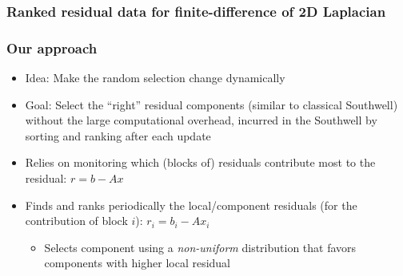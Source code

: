 \documentclass{beamer}
\begin{document}
\begin{frame}
	\frametitle{Ranked residual data for finite-difference of 2D Laplacian}
	\begin{figure}[H]
		\centering
	\end{figure}
\end{frame}


\begin{frame}
	\frametitle{Our approach}
	\begin{itemize}
		\item Idea: Make the random selection change dynamically 
		\item Goal: Select the ``right'' residual components (similar to classical Southwell) without the large computational overhead, incurred in the Southwell  by sorting and ranking after each update
		\item Relies on monitoring which (blocks of) residuals contribute most to the residual: $r = b - Ax$
		\item Finds and ranks periodically the local/component residuals (for the contribution of block $i$): $r_i = b_i - Ax_i $
			\begin{itemize}
	            \item Selects component using a {\it non-uniform} distribution that favors components with higher local residual
	        \end{itemize}
	\end{itemize}
\end{frame}
\end{document}
